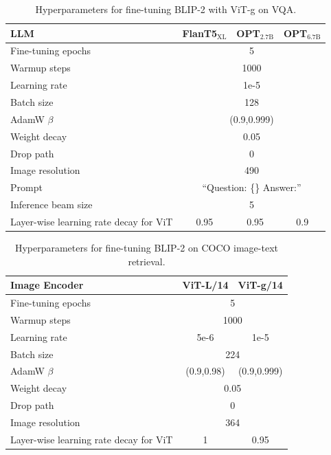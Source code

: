\begin{table}[!t]
    \small
	\centering	
 \begin{tabular}	{l  |  c  c  c  }
        \toprule
        LLM & FlanT5$_\text{XL}$ & OPT$_\text{2.7B}$ & OPT$_\text{6.7B}$\\
        \midrule
        Fine-tuning epochs & \multicolumn{3}{c}{5}\\
        Warmup steps & \multicolumn{3}{c}{1000}\\
        Learning rate & \multicolumn{3}{c}{1e-5} \\
        Batch size & \multicolumn{3}{c}{128} \\
        AdamW $\beta$ & \multicolumn{3}{c}{(0.9,0.999)} \\
        Weight decay & \multicolumn{3}{c}{0.05}\\
        Drop path & \multicolumn{3}{c}{0}\\
        Image resolution & \multicolumn{3}{c}{490}\\
        Prompt & \multicolumn{3}{c}{``Question: \{\} Answer:''}\\
        Inference beam size & \multicolumn{3}{c}{5}\\   
        Layer-wise learning rate decay for ViT & 0.95 & 0.95 & 0.9\\
 	\bottomrule	
	\end{tabular}

 \vspace{-1ex}
	\caption
	{
	\small	
        Hyperparameters for fine-tuning BLIP-2 with ViT-g on VQA.
	}
	\vspace{-1ex}
\end{table}		 


\begin{table}[!t]
    \small
	\centering	
 \begin{tabular}	{l  |  c  c  }
        \toprule
        Image Encoder & ViT-L/14 & ViT-g/14\\
        \midrule
        Fine-tuning epochs & \multicolumn{2}{c}{5}\\
        Warmup steps & \multicolumn{2}{c}{1000}\\
        Learning rate& 5e-6 & 1e-5  \\
        Batch size & \multicolumn{2}{c}{224} \\
        AdamW $\beta$ & (0.9,0.98) & (0.9,0.999) \\
        Weight decay & \multicolumn{2}{c}{0.05}\\
        Drop path & \multicolumn{2}{c}{0}\\
        Image resolution & \multicolumn{2}{c}{364}\\
        Layer-wise learning rate decay for ViT & 1 & 0.95\\
 	\bottomrule	
	\end{tabular}

 \vspace{-1ex}
	\caption
	{
	\small	
        Hyperparameters for fine-tuning BLIP-2 on COCO image-text retrieval.
	}
	\vspace{-1ex}
\end{table}	


